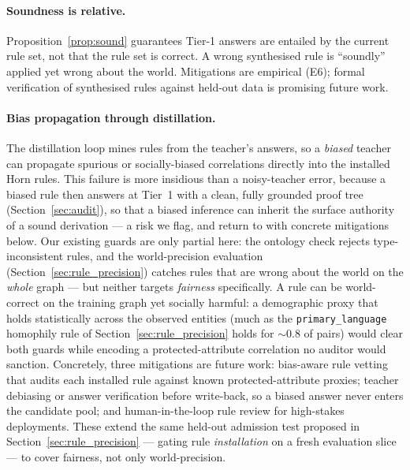 \documentclass[11pt]{article}
\theoremstyle{plain}
\begin{document}
\paragraph{Soundness is relative.} Proposition~\ref{prop:sound} guarantees
Tier-1 answers are entailed by the current rule set, not that the rule set
is correct. A wrong synthesised rule is ``soundly'' applied yet wrong about
the world. Mitigations are empirical (E6); formal verification of
synthesised rules against held-out data is promising future work.

\paragraph{Bias propagation through distillation.} The distillation loop
mines rules from the teacher's answers, so a \emph{biased} teacher can
propagate spurious or socially-biased correlations directly into the
installed Horn rules. This failure is more insidious than a noisy-teacher
error, because a biased rule then answers at Tier~1 with a clean, fully
grounded proof tree (Section~\ref{sec:audit}), so that a biased inference can inherit the surface authority of a sound
derivation --- a risk we flag, and return to with concrete mitigations below. Our
existing guards are only partial here: the ontology check rejects
type-inconsistent rules, and the world-precision evaluation
(Section~\ref{sec:rule_precision}) catches rules that are wrong about the
world on the \emph{whole} graph --- but neither targets \emph{fairness}
specifically. A rule can be world-correct on the training graph yet socially
harmful: a demographic proxy that holds statistically across the observed
entities (much as the \texttt{primary\_language} homophily rule of
Section~\ref{sec:rule_precision} holds for ${\sim}0.8$ of pairs) would clear
both guards while encoding a protected-attribute correlation no auditor would
sanction. Concretely, three mitigations are future work: bias-aware rule
vetting that audits each installed rule against known protected-attribute
proxies; teacher debiasing or answer verification before write-back, so a
biased answer never enters the candidate pool; and human-in-the-loop rule
review for high-stakes deployments. These extend the same held-out admission
test proposed in Section~\ref{sec:rule_precision} --- gating rule
\emph{installation} on a fresh evaluation slice --- to cover fairness, not
only world-precision.
\end{document}
